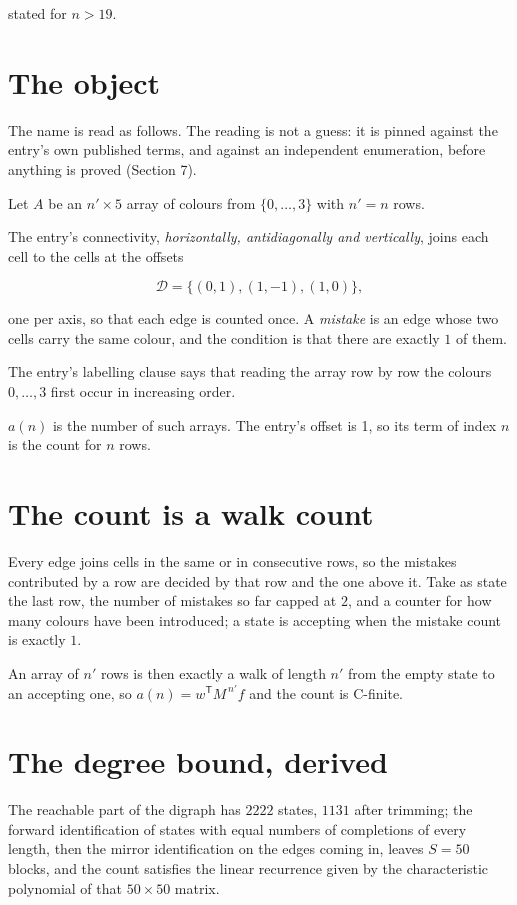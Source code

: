 \documentclass[11pt]{article}
\theoremstyle{definition}
\begin{document}
stated for $n > 19$.

\section{The object}

The name is read as follows. The reading is not a guess: it is pinned against the entry's own published terms, and against an independent enumeration, before anything is proved (Section 7).

Let $A$ be an $n' \times 5$ array of colours from $\{0,\dots,3\}$ with $n' = n$ rows.

The entry's connectivity, {\itshape horizontally, antidiagonally and vertically}, joins each cell to the cells at the offsets

\[\mathcal{D} = \{(0,1), (1,-1), (1,0)\},\]

one per axis, so that each edge is counted once. A {\itshape mistake} is an edge whose two cells carry the same colour, and the condition is that there are exactly $1$ of them.

The entry's labelling clause says that reading the array row by row the colours $0,\dots,3$ first occur in increasing order.

$a(n)$ is the number of such arrays. The entry's offset is 1, so its term of index $n$ is the count for $n$ rows.

\section{The count is a walk count}

Every edge joins cells in the same or in consecutive rows, so the mistakes contributed by a row are decided by that row and the one above it. Take as state the last row, the number of mistakes so far capped at $2$, and a counter for how many colours have been introduced; a state is accepting when the mistake count is exactly $1$.

An array of $n'$ rows is then exactly a walk of length $n'$ from the empty state to an accepting one, so $a(n) = w^{\mathsf T}M^{\,n'}f$ and the count is C-finite.

\section{The degree bound, derived}

The reachable part of the digraph has $2222$ states, $1131$ after trimming; the forward identification of states with equal numbers of completions of every length, then the mirror identification on the edges coming in, leaves $S = 50$ blocks, and the count satisfies the linear recurrence given by the characteristic polynomial of that $50\times50$ matrix.
\end{document}
